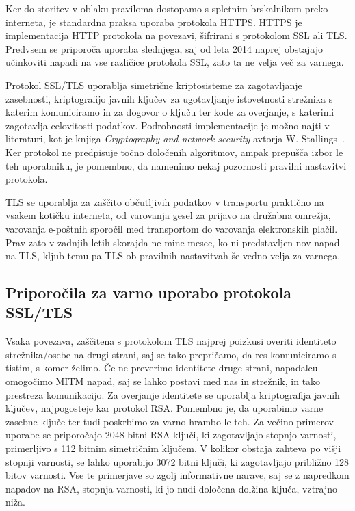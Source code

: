 \documentclass[12pt,a4paper,openany,tikz]{book}
\theoremstyle{plain}
\theoremstyle{definition}
\begin{document}
Ker do storitev v oblaku praviloma dostopamo s spletnim brskalnikom preko interneta, je standardna praksa uporaba protokola \gls{HTTPS}. \Gls{HTTPS} je implementacija HTTP protokola na povezavi, šifrirani s protokolom \gls{SSL} ali \gls{TLS}. Predvsem se priporoča uporaba slednjega, saj od leta 2014 naprej obstajajo učinkoviti napadi na vse različice protokola \gls{SSL}, zato ta ne velja več za varnega.

Protokol SSL/TLS uporablja simetrične kriptosisteme za zagotavljanje zasebnosti, kriptografijo javnih ključev za ugotavljanje istovetnosti strežnika s katerim komuniciramo in za dogovor o ključu ter kode za overjanje, s katerimi zagotavlja celovitosti podatkov. Podrobnosti implementacije je možno najti v literaturi, kot je knjiga \textit{Cryptography and network security} avtorja W. Stallings~\cite{stallings2006cryptography}. Ker protokol ne predpisuje točno določenih algoritmov, ampak prepušča izbor le teh uporabniku, je pomembno, da namenimo nekaj pozornosti pravilni nastavitvi protokola.

\Gls{TLS} se uporablja za zaščito občutljivih podatkov v transportu praktično na vsakem kotičku interneta, od varovanja gesel za prijavo na družabna omrežja, varovanja e-poštnih sporočil med transportom do varovanja elektronskih plačil. Prav zato v zadnjih letih skorajda ne mine mesec, ko ni predstavljen nov napad na \gls{TLS}, kljub temu pa \gls{TLS} ob pravilnih nastavitvah še vedno velja za varnega.

\subsection{Priporočila za varno uporabo protokola SSL/TLS}
\label{sub:Priporočila za varno uporabo protokola SSL/TLS}

Vsaka povezava, zaščitena s protokolom TLS najprej poizkusi overiti identiteto strežnika/osebe na drugi strani, saj se tako prepričamo, da res komuniciramo s tistim, s komer želimo. Če ne preverimo identitete druge strani, napadalcu omogočimo MITM napad, saj se lahko postavi med nas in strežnik, in tako prestreza komunikacijo. Za overjanje identitete se uporablja kriptografija javnih ključev, najpogosteje kar protokol RSA. Pomembno je, da uporabimo varne zasebne ključe ter tudi poskrbimo za varno hrambo le teh. Za večino primerov uporabe se priporočajo 2048 bitni RSA ključi, ki zagotavljajo stopnjo varnosti, primerljivo s 112 bitnim simetričnim ključem. V kolikor obstaja zahteva po višji stopnji varnosti, se lahko uporabijo 3072 bitni ključi, ki zagotavljajo približno 128 bitov varnosti. Vse te primerjave so zgolj informativne narave, saj se z napredkom napadov na RSA, stopnja varnosti, ki jo nudi določena dolžina ključa, vztrajno niža.
\end{document}
